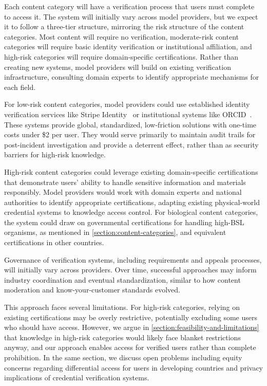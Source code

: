 \documentclass{article}
\theoremstyle{plain}
\theoremstyle{definition}
\theoremstyle{remark}
\begin{document}
Each content category will have a verification process that users must complete to access it.
The system will initially vary across model providers, but we expect it to follow a three-tier structure, mirroring the risk structure of the content categories.
Most content will require no verification, moderate-risk content categories will require basic identity verification or institutional affiliation, and high-risk categories will require domain-specific certifications.
Rather than creating new systems, model providers will build on existing verification infrastructure, consulting domain experts to identify appropriate mechanisms for each field.

For low-risk content categories, model providers could use established identity verification services like Stripe Identity~\cite{stripe_identity_2024} or institutional systems like ORCID~\cite{orcid_2024}.
These systems provide global, standardized, low-friction solutions with one-time costs under \$2 per user.
They would serve primarily to maintain audit trails for post-incident investigation and provide a deterrent effect, rather than as security barriers for high-risk knowledge.

High-risk content categories could leverage existing domain-specific certifications that demonstrate users' ability to handle sensitive information and materials responsibly.
Model providers would work with domain experts and national authorities to identify appropriate certifications, adapting existing physical-world credential systems to knowledge access control.
For biological content categories, the system could draw on governmental certifications for handling high-BSL organisms, as mentioned in \cref{section:content-categories}, and equivalent certifications in other countries.

Governance of verification systems, including requirements and appeals processes, will initially vary across providers.
Over time, successful approaches may inform industry coordination and eventual standardization, similar to how content moderation and know-your-customer standards evolved.

This approach faces several limitations.
For high-risk categories, relying on existing certifications may be overly restrictive, potentially excluding some users who should have access.
However, we argue in \cref{section:feasibility-and-limitations} that knowledge in high-risk categories would likely face blanket restrictions anyway, and our approach enables access for verified users rather than complete prohibition.
In the same section, we discuss open problems including equity concerns regarding differential access for users in developing countries and privacy implications of credential verification systems.
\end{document}

